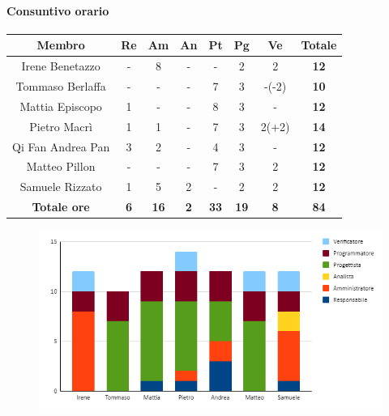 \paragraph{Consuntivo orario}
\begin{center}
	\renewcommand{\arraystretch}{1.8}
	\begin{tabular}{ |c|c|c|c|c|c|c|c| }
	\hline
	\textbf{Membro} & \textbf{Re} & \textbf{Am} &  \textbf{An} &  \textbf{Pt} &  \textbf{Pg} &  \textbf{Ve} &  \textbf{Totale}\\
    \hline
    Irene Benetazzo   & - & 8 & - & - & 2 & 2 & \textbf{12} \\
    \hline
    Tommaso Berlaffa  & - & - & - & 7 & 3 & -(-2) & \textbf{10} \\
    \hline
    Mattia Episcopo   & 1 & - & - & 8 & 3 & - & \textbf{12} \\
    \hline
    Pietro Macrì      & 1 & 1 & - & 7 & 3 & 2(+2) & \textbf{14} \\
    \hline
    Qi Fan Andrea Pan & 3 & 2 & - & 4 & 3 & - & \textbf{12} \\
    \hline
    Matteo Pillon     & - & - & - & 7 & 3 & 2 & \textbf{12} \\
    \hline
    Samuele Rizzato   & 1 & 5 & 2 & - & 2 & 2 & \textbf{12} \\
    \hline
    \textbf{Totale ore} & \textbf{6} & \textbf{16} &  \textbf{2} &  \textbf{33} &  \textbf{19} &  \textbf{8} &  \textbf{84}\\
    \hline
	\end{tabular}
\end{center}
\begin{figure}[H]
    \centering\includegraphics[width=\textwidth, height=\textheight,keepaspectratio]{images/consuntivo/RTB-tecnologico-ore.png}
\end{figure}

